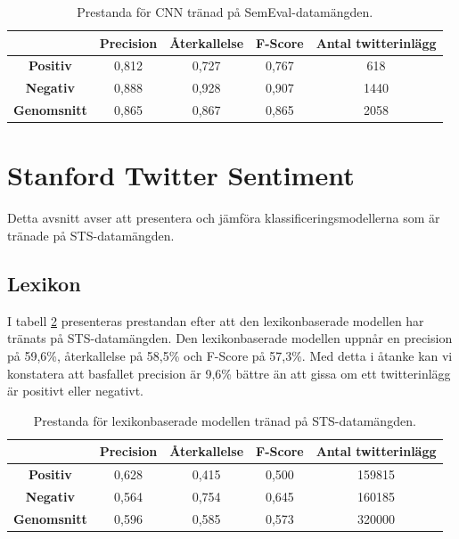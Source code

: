 \documentclass{kaumasters} %
\begin{document}
\begin{table}[H]
\centering
\caption{Prestanda för CNN tränad på SemEval-datamängden.}
\label{tab:cnn_se}
    \begin{tabular}{ccccc}
    \toprule
     & \textbf{Precision} & \textbf{Återkallelse} & \textbf{F-Score} & \textbf{Antal twitterinlägg}  \\
    \midrule
    \textbf{Positiv} & 0,812 & 0,727 & 0,767 & 618 \\
    \textbf{Negativ} & 0,888 & 0,928 & 0,907 & 1440 \\
    \midrule
    \textbf{Genomsnitt} & 0,865 & 0,867 & 0,865  & 2058 \\
    \bottomrule
\end{tabular}
\end{table}

\section{Stanford Twitter Sentiment}\label{res:sts}
Detta avsnitt avser att presentera och jämföra klassificeringsmodellerna som är tränade på STS-datamängden.

\subsection{Lexikon}
I tabell \ref{tab:lexi_sts} presenteras prestandan efter att den lexikonbaserade modellen har tränats på STS-datamängden. Den lexikonbaserade modellen uppnår en precision på 59,6\%, återkallelse på 58,5\% och F-Score på 57,3\%. Med detta i åtanke kan vi konstatera att basfallet precision är 9,6\% bättre än att gissa om ett twitterinlägg är positivt eller negativt.

\begin{table}[H]
\centering
\caption{Prestanda för lexikonbaserade modellen tränad på STS-datamängden.}
\label{tab:lexi_sts}
    \begin{tabular}{ccccc}
    \toprule
     & \textbf{Precision} & \textbf{Återkallelse} & \textbf{F-Score} & \textbf{Antal twitterinlägg}  \\
    \midrule
    \textbf{Positiv} & 0,628 & 0,415 & 0,500 & 159815 \\
    \textbf{Negativ} & 0,564 & 0,754 & 0,645 & 160185 \\
    \midrule
    \textbf{Genomsnitt} & 0,596 & 0,585 & 0,573  & 320000 \\
    \bottomrule
\end{tabular}
\end{table}
\end{document}
